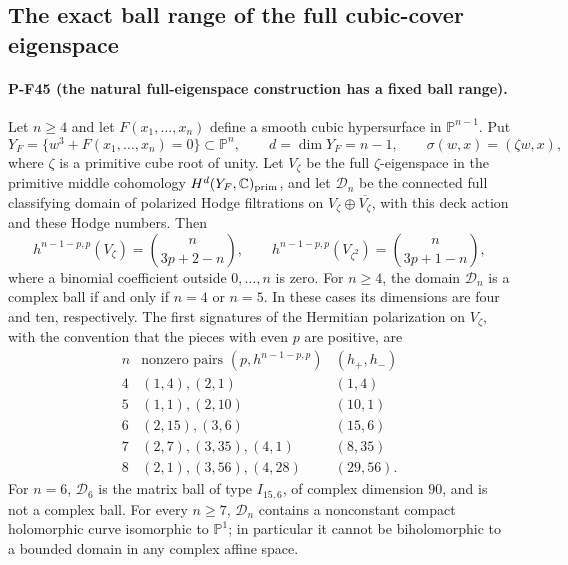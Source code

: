 \subsection{The exact ball range of the full cubic-cover eigenspace}
\label{sec:cyclic-cover-range}

\paragraph{P-F45 (the natural full-eigenspace construction has a fixed ball range).}
Let $n\ge4$ and let $F(x_1,\ldots,x_n)$ define a smooth cubic
hypersurface in $\mathbb P^{n-1}$. Put
\[
 Y_F=\{w^3+F(x_1,\ldots,x_n)=0\}\subset\mathbb P^n,
 \qquad d=\dim Y_F=n-1,
 \qquad \sigma(w,x)=(\zeta w,x),
\]
where $\zeta$ is a primitive cube root of unity. Let $V_\zeta$
be the full $\zeta$-eigenspace in the primitive middle cohomology
$H^d(Y_F,\mathbb C)_{\rm prim}$, and let $\mathcal D_n$ be
the connected full classifying domain of polarized Hodge
filtrations on $V_\zeta\oplus\overline{V_\zeta}$, with this
deck action and these Hodge numbers. Then
\[
 h^{n-1-p,p}(V_\zeta)=\binom n{3p+2-n},
 \qquad
 h^{n-1-p,p}(V_{\zeta^2})=\binom n{3p+1-n},
 \tag{P-F45a}
\]
where a binomial coefficient outside $0,\ldots,n$ is zero.
For $n\ge4$, the domain $\mathcal D_n$ is a complex ball
if and only if $n=4$ or $n=5$. In these cases its dimensions
are four and ten, respectively. The first signatures of the
Hermitian polarization on $V_\zeta$, with the convention
that the pieces with even $p$ are positive, are
\[
\begin{array}{c|c|c}
n&\text{nonzero pairs }(p,h^{n-1-p,p})& (h_+,h_-)\\ \hline
4&(1,4),(2,1)&(1,4)\\
5&(1,1),(2,10)&(10,1)\\
6&(2,15),(3,6)&(15,6)\\
7&(2,7),(3,35),(4,1)&(8,35)\\
8&(2,1),(3,56),(4,28)&(29,56).
\end{array}
\tag{P-F45b}
\]
For $n=6$, $\mathcal D_6$ is the matrix ball of type
$I_{15,6}$, of complex dimension $90$, and is not a complex
ball. For every $n\ge7$, $\mathcal D_n$ contains a nonconstant
compact holomorphic curve isomorphic to $\mathbb P^1$;
in particular it cannot be biholomorphic to a bounded domain
in any complex affine space.

